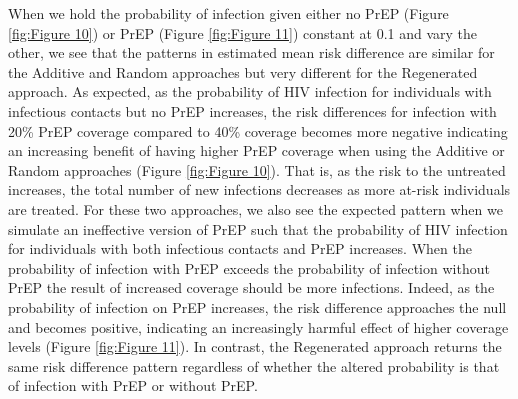 \documentclass{article}
\theoremstyle{definition}
\begin{document}
When we hold the probability of infection given either no PrEP (Figure \ref{fig:Figure 10}) or PrEP (Figure \ref{fig:Figure 11}) constant at 0.1 and vary the other, we see that the patterns in estimated mean risk difference are similar for the Additive and Random approaches but very different for the Regenerated approach. As expected, as the probability of HIV infection for individuals with infectious contacts but no PrEP increases, the risk differences for infection with 20\% PrEP coverage compared to 40\% coverage becomes more negative indicating an increasing benefit of having higher PrEP coverage when using the Additive or Random approaches (Figure \ref{fig:Figure 10}). That is, as the risk to the untreated increases, the total number of new infections decreases as more at-risk individuals are treated. For these two approaches, we also see the expected pattern when we simulate an ineffective version of PrEP such that the probability of HIV infection for individuals with both infectious contacts and PrEP increases. When the probability of infection with PrEP exceeds the probability of infection without PrEP the result of increased coverage should be more infections. Indeed, as the probability of infection on PrEP increases, the risk difference approaches the null and becomes positive, indicating an increasingly harmful effect of higher coverage levels (Figure \ref{fig:Figure 11}). In contrast, the Regenerated approach returns the same risk difference pattern regardless of whether the altered probability is that of infection with PrEP or without PrEP.
\end{document}
